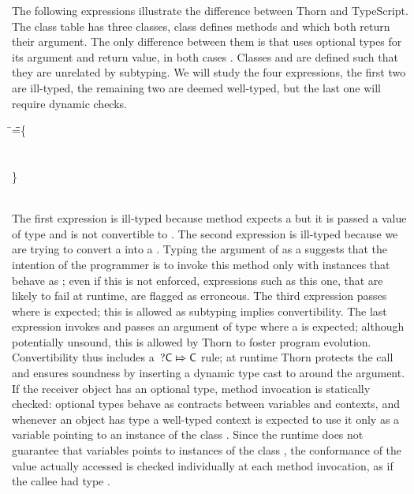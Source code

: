 \documentclass[acmlarge, anonymous, authordraft, review]{acmart} %
\begin{document}
The following expressions illustrate the difference between Thorn and
TypeScript.  The class table \K has three classes, class \A defines methods
\m and \n which both return their argument. The only difference between them
is that \m uses optional types for its argument and return value, in both
cases \CW.  Classes \C and \D are defined such that they are unrelated by
subtyping. We will study the four expressions, the first two are ill-typed,
the remaining two are deemed well-typed, but the last one will require
dynamic checks.

\medskip

\begin{tabbing}
\HS\HS\HS\=  
\Call{\New\A{}}\n{\New\D{}}\HS\HS\HS\HS\HS\HS\HS\HS\HS\HS\HS\HS\HS \WHERE \HS\K\HS=\HS\=\class\= \A \{
\\\>
\Call{\New\A{}}\m{\New\D{}}
  \>    \>  \Mdef \n\x\C\C{~\x~}
\\\>
\Call{\New\A{}}\m{\Call{\New\A{}}\n{\New\C{}}}
  \>    \> \Mdef \m\x{\dt\C} {\dt\C}{~\x~}
\\\>
\Call{\New\A{}}\n{\Call{\New\A{}}\m{\New\C{}}}
  \> \}
  \\\>   \> \Class\C{}{\Mdef\mp\x\any\any\x}
  \\\>   \> \Class\D{}{\Mdef\m\x\any\any\x}


\end{tabbing}
\medskip

\noindent
The first expression is ill-typed because method \n expects a \dt\C but it
is passed a value of type \D and \D is not convertible to \C. The second
expression is ill-typed because we are trying to convert a \D into a \dt\C.
Typing the argument of \m as a \dt\C suggests that the intention of the
programmer is to invoke this method only with instances that behave as \C;
even if this is not enforced, expressions such as this one, that are likely
to fail at runtime, are flagged as erroneous. The third expression passes \C
where \dt\C is expected; this is allowed as subtyping implies
convertibility.  The last expression invokes \n and passes an argument of
type \dt\C where a \C is expected; although potentially unsound, this is
allowed by Thorn to foster program evolution.  Convertibility thus includes
a \(\dt\C\Mapsto\C\) rule; at runtime Thorn protects the call and ensures
soundness by inserting a dynamic type cast to \C around the argument.  If
the receiver object has an optional type, method invocation is statically
checked: optional types behave as contracts between variables and contexts,
and whenever an object has type \dt\C a well-typed context is expected to
use it only as a variable pointing to an instance of the class \C.  Since
the runtime does not guarantee that \dt\C variables points to instances of
the class \C, the conformance of the value actually accessed is checked
individually at each method invocation, as if the callee had type \any.
\end{document}
